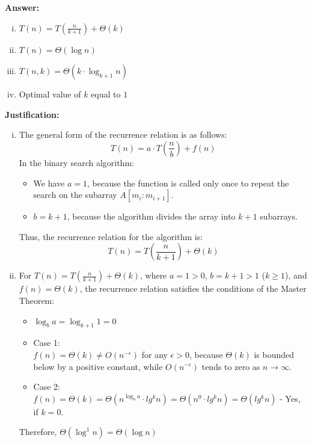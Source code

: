 \documentclass[dvipsnames]{article}
\begin{document}
\begin{enumerate}
  \color{blue}
  \textbf{Answer:}
  \begin{enumerate}[(i)]
    \item $T(n) = T(\frac{n}{k+1}) + \Theta(k)$
    \item $T(n) = \Theta(\log n)$
    \item $T(n,k) = \Theta(k\cdot \log_{k+1} n)$
    \item Optimal value of $k$ equal to $1$
  \end{enumerate}
  \textbf{Justification: }
  \begin{enumerate}[(i)]
    \item The general form of the recurrence relation is as follows:
\[
T(n) = a \cdot T\left(\frac{n}{b}\right) + f(n)
\]
\hspace{20em} In the binary search algorithm:
\begin{itemize}
    \item We have $a = 1$, because the function is called only once to repeat the search on the subarray $A[m_i : m_{i+1}]$.
    \item $b = k + 1$, because the algorithm divides the array into $ k + 1 $ subarrays.
\end{itemize}

Thus, the recurrence relation for the algorithm is:
\[
T(n) = T\left(\frac{n}{k+1}\right) + \Theta(k)
\]



\item For $T(n) = T(\frac{n}{k+1}) + \Theta(k)$, where $ a = 1 > 0 $, $ b = k + 1 > 1 $ ($k \geq 1 $), and $ f(n) = \Theta(k)$, the recurrence relation satisfies the conditions of the Master Theorem:
    \begin{itemize}
        \item $ \log_{b} a =\log_{k+1} 1 = 0 $
        \item Case 1: \\
        \hspace{30mm} $ f(n) = \Theta(k) \neq O(n^{-\epsilon}) $ for any $ \epsilon > 0 $, because $ \Theta(k) $ is bounded below by a positive constant, while $ O(n^{-\epsilon}) $ tends to zero as $ n \to \infty $.
        \item Case 2: \\
        \hspace{30mm} $ f(n) = \Theta(k) = \Theta(n^{\log_{b} a}\cdot lg^k n) = \Theta(n^0\cdot lg^k n) = \Theta(lg^k n)$ - Yes, if $k = 0$.
    \end{itemize}
    Therefore, $\Theta(\log^1 n) = \Theta(\log n)$





\end{enumerate}
\end{enumerate}
\end{document}
